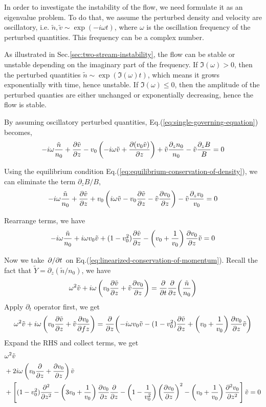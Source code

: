 In order to investigate the instability of the flow, we need formulate it as an eigenvalue problem. To do that, we assume the perturbed density and velocity are oscillatory, i.e. $\tilde{n}, \tilde{v} \sim \exp(-i\omega t)$, where $\omega$ is the oscillation frequency of the perturbed quantities. This frequency can be a complex number.

As illustrated in Sec.\ref{sec:two-stream-instability}, the flow can be stable or unstable depending on the imaginary part of the frequency. If $\Im(\omega) > 0$, then the perturbed quantities $\tilde{n} \sim \exp(\Im(\omega) t)$, which means it grows exponentially with time, hence unstable. If $\Im(\omega) \leq 0$, then the amplitude of the perturbed quanties are either unchanged or exponentially decreasing, hence the flow is stable.

By assuming oscillatory perturbed quantities, Eq.(\ref{eq:single-governing-equation}) becomes,
\begin{equation}
	-i\omega\frac{\tilde{n}}{n_0}
	+ \pdv{\tilde{v}}{z} - v_0\left(-i\omega\tilde{v}
	+ \pdv{(v_0\tilde{v})}{z}\right)
	+ \tilde{v}\frac{\partial_z n_0}{n_0}
	- \tilde{v}\frac{\partial_z B}{B}
	= 0
\end{equation}

Using the equilibrium condition Eq.(\ref{eq:equilibrium-conservation-of-density}), we can eliminate the term $\partial_z B/B$,
\[
	-i\omega\frac{\tilde{n}}{n_0}
	+ \pdv{\tilde{v}}{z}
	+ v_0\left(i\omega \tilde{v} - v_0\pdv{\tilde{v}}{z} - \tilde{v}\pdv{v_0}{z} \right)
	- \tilde{v}\frac{\partial_z v_0}{v_0}
	= 0
\]

Rearrange terms, we have
\[
	-i\omega\frac{\tilde{n}}{n_0}
	+ i\omega v_0\tilde{v}
	+ (1-v_0^2)\pdv{\tilde{v}}{z}
	- \left(v_0+\frac{1}{v_0}\right)\pdv{v_0}{z}\tilde{v} = 0
\]

Now we take $\pdv*{t}$ on Eq.(\ref{eq:linearized-conservation-of-momentum}). Recall the fact that $\tilde{Y} = \partial_z(\tilde{n}/n_0)$, we have
\[
	\omega^2\tilde{v} + i\omega\left(v_0\pdv{\tilde{v}}{z} + \tilde{v}\pdv{v_0}{z}\right)
	= \pdv{t}\pdv{z}(\frac{\tilde{n}}{n_0})
\]
Apply $\partial_t$ operator first, we get
\[
	\omega^2\tilde{v} + i\omega\left(v_0\pdv{\tilde{v}}{z} + \tilde{v}\pdv{v_0}{fz}\right)
	= \pdv{z}(-i\omega v_0\tilde{v}
	- (1-v_0^2)\pdv{\tilde{v}}{z}
	+ \left(v_0+\frac{1}{v_0}\right)\pdv{v_0}{z}\tilde{v})
\]
Expand the RHS and collect terms, we get
\begin{equation} \label{eq:polynomial-eigenvalue-problem}
	\begin{aligned}
		 & \omega^2 \tilde{v}                                          \\
		 & +2i\omega\left(v_0\pdv{}{z} + \pdv{v_0}{z}\right) \tilde{v} \\
		 & +\left[ (1-v_0^2)\pdv[2]{}{z}
			-\left(3v_0 + \frac{1}{v_0}\right)\pdv{v_0}{z}\pdv{}{z}
			- \left(1-\frac{1}{v_0^2}\right)\left(\pdv{v_0}{z}\right)^2
			- \left(v_0+\frac{1}{v_0}\right)\pdv[2]{v_0}{z} \right]\tilde{v}
		= 0
	\end{aligned}
\end{equation}

